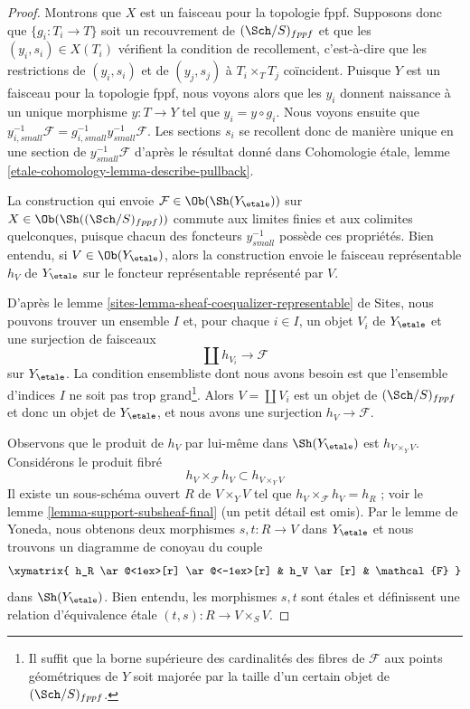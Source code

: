 \begin{proof}
Montrons que $X$ est un faisceau pour la topologie fppf. Supposons donc
que $\{g_i : T_i \to T\}$ soit un recouvrement de $(\Sch/S)_{fppf}$ et que
les $(y_i, s_i) \in X(T_i)$ vérifient la condition de recollement, c'est-à-dire que les
restrictions de $(y_i, s_i)$ et de $(y_j, s_j)$ à $T_i \times_T T_j$ coïncident.
Puisque $Y$ est un faisceau pour la topologie fppf, nous voyons alors que
les $y_i$ donnent naissance à un unique morphisme $y : T \to Y$ tel que
$y_i = y \circ g_i$. Nous voyons ensuite que
$y_{i, small}^{-1}\mathcal{F} = g_{i, small}^{-1}y_{small}^{-1}\mathcal{F}$.
Les sections $s_i$ se recollent donc de manière unique en une section de
$y_{small}^{-1}\mathcal{F}$ d'après le résultat donné dans
Cohomologie \'etale, lemme \ref{etale-cohomology-lemma-describe-pullback}.

\medskip\noindent
La construction qui envoie $\mathcal{F} \in \Ob(\Sh(Y_\etale))$
sur $X \in \Ob(\Sh((\Sch/S)_{fppf}))$ commute aux limites finies et
aux colimites quelconques, puisque chacun des foncteurs $y_{small}^{-1}$ possède
ces propriétés. Bien entendu, si $V \in \Ob(Y_\etale)$, alors
la construction envoie le faisceau représentable $h_V$ de $Y_\etale$
sur le foncteur représentable représenté par $V$.

\medskip\noindent
D'après le lemme \ref{sites-lemma-sheaf-coequalizer-representable} de Sites,
nous pouvons trouver un ensemble $I$ et, pour chaque $i \in I$, un objet $V_i$ de $Y_\etale$
et une surjection de faisceaux
$$
\coprod h_{V_i} \longrightarrow \mathcal{F}
$$
sur $Y_\etale$. La condition ensembliste dont nous avons besoin est que l'ensemble
d'indices $I$ ne soit pas trop grand\footnote{Il suffit que la borne supérieure des
cardinalités des fibres de $\mathcal{F}$ aux points géométriques de $Y$
soit majorée par la taille d'un certain objet de $(\Sch/S)_{fppf}$.}.
Alors $V = \coprod V_i$ est un objet de $(\Sch/S)_{fppf}$ et
donc un objet de $Y_\etale$, et nous avons une surjection
$h_V \to \mathcal{F}$.

\medskip\noindent
Observons que le produit de $h_V$ par lui-même dans $\Sh(Y_\etale)$
est $h_{V \times_Y V}$. Considérons le produit fibré
$$
h_V \times_\mathcal{F} h_V \subset h_{V \times_Y V}
$$
Il existe un sous-schéma ouvert $R$ de $V \times_Y V$ tel que
$h_V \times_\mathcal{F} h_V = h_R$ ; voir le
lemme \ref{lemma-support-subsheaf-final} (un petit détail est omis).
Par le lemme de Yoneda, nous obtenons deux morphismes $s, t : R \to V$ dans $Y_\etale$
et nous trouvons un diagramme de conoyau du couple
$$
\xymatrix{
h_R \ar@<1ex>[r] \ar@<-1ex>[r] &
h_V \ar[r] &
\mathcal{F}
}
$$
dans $\Sh(Y_\etale)$. Bien entendu, les morphismes $s, t$ sont \'etales
et définissent une relation d'équivalence \'etale $(t, s) : R \to V \times_S V$.


\end{proof}
